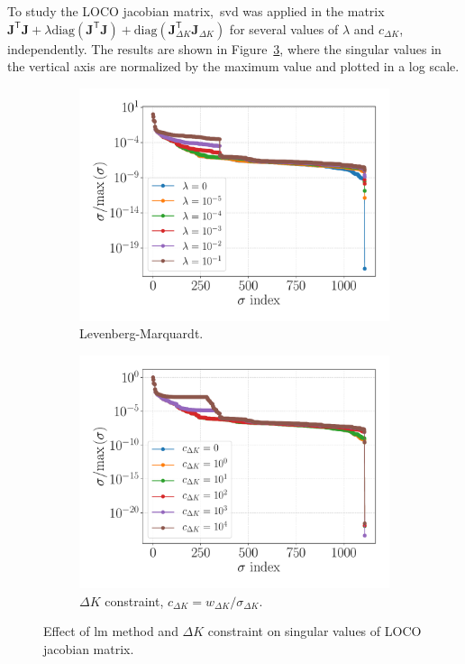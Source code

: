 To study the LOCO jacobian matrix,~\gls{svd} was applied in the matrix $\mathbf{J}^{\mathsf{T}}\mathbf{J} + \lambda \mathrm{diag}\left(\mathbf{J}^{\mathsf{T}}\mathbf{J}\right) + \mathrm{diag}\left(\mathbf{J}^{\mathsf{T}}_{\Delta K}\mathbf{J}_{\Delta K}\right)$ for several values of $\lambda$ and ${c}_{\Delta K}$, independently. The results are shown in Figure~\ref{fig:singval}, where the singular values in the vertical axis are normalized by the maximum value and plotted in a log scale.
\begin{figure}
\centering
\begin{subfigure}[t]{0.49\textwidth}
\includegraphics[width=1.0\textwidth]{figures/lm_singular_values_big.pdf}
    \caption{Levenberg-Marquardt.}
    \label{subfig:lm}
\end{subfigure}
 \begin{subfigure}[t]{0.49\textwidth}
\includegraphics[width=1.0\textwidth]{figures/constraint_singular_values_big.pdf}
    \caption{$\Delta K$ constraint, $c_{\Delta K} = w_{\Delta K}/\sigma_{\Delta K}$.}
    \label{subfig:constraint}
\end{subfigure}
\caption{Effect of \gls{lm} method and $\Delta K$ constraint on singular values of LOCO jacobian matrix.}
\label{fig:singval}
\end{figure}

